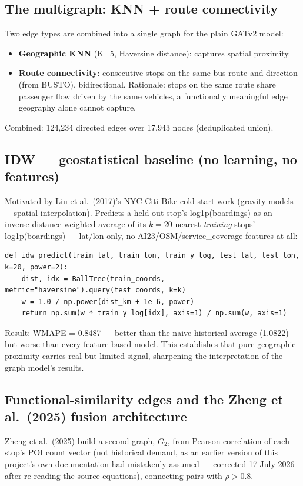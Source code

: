 \documentclass[11pt]{article}
\let\oldsubsection\subsection
\renewcommand{\subsection}[1]{\oldsubsection{\color{sectcolor}#1}}
\begin{document}
\subsection{The multigraph: KNN + route connectivity}
Two edge types are combined into a single graph for the plain GATv2 model:
\begin{itemize}
\item \textbf{Geographic KNN} (K=5, Haversine distance): captures spatial proximity.
\item \textbf{Route connectivity}: consecutive stops on the same bus route and direction
(from BUSTO), bidirectional. Rationale: stops on the same route share passenger flow driven
by the same vehicles, a functionally meaningful edge geography alone cannot capture.
\end{itemize}
Combined: 124{,}234 directed edges over 17{,}943 nodes (deduplicated union).

\subsection{IDW --- geostatistical baseline (no learning, no features)}
\label{sec:idw}
Motivated by Liu et al.\ (2017)'s NYC Citi Bike cold-start work (gravity models + spatial
interpolation). Predicts a held-out stop's log1p(boardings) as an inverse-distance-weighted
average of its $k{=}20$ nearest \emph{training} stops' log1p(boardings) --- lat/lon only, no
AI23/OSM/service\_coverage features at all:
{\small\begin{verbatim}
def idw_predict(train_lat, train_lon, train_y_log, test_lat, test_lon, k=20, power=2):
    dist, idx = BallTree(train_coords, metric="haversine").query(test_coords, k=k)
    w = 1.0 / np.power(dist_km + 1e-6, power)
    return np.sum(w * train_y_log[idx], axis=1) / np.sum(w, axis=1)
\end{verbatim}}
Result: WMAPE = 0.8487 --- better than the naive historical average (1.0822) but worse than
every feature-based model. This establishes that pure geographic proximity carries real but
limited signal, sharpening the interpretation of the graph model's results.

\subsection{Functional-similarity edges and the Zheng et al.\ (2025) fusion architecture}
\label{sec:fusion}
Zheng et al.\ (2025) build a second graph, $G_2$, from Pearson correlation of each stop's POI
count vector (not historical demand, as an earlier version of this project's own documentation
had mistakenly assumed --- corrected 17 July 2026 after re-reading the source equations),
connecting pairs with $\rho > 0.8$.
\end{document}
